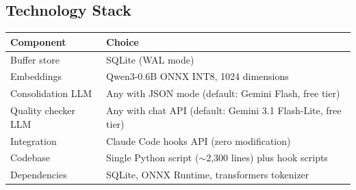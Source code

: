\documentclass[11pt,a4paper]{article}
\begin{document}

\subsection*{Technology Stack}

\begin{table}[h]
\centering
\small
\begin{tabular}{ll}
\toprule
\textbf{Component} & \textbf{Choice} \\
\midrule
Buffer store & SQLite (WAL mode) \\
Embeddings & Qwen3-0.6B ONNX INT8, 1024 dimensions \\
Consolidation LLM & Any with JSON mode (default: Gemini Flash, free tier) \\
Quality checker LLM & Any with chat API (default: Gemini 3.1 Flash-Lite, free tier) \\
Integration & Claude Code hooks API (zero modification) \\
Codebase & Single Python script ($\sim$2,300 lines) plus hook scripts \\
Dependencies & SQLite, ONNX Runtime, transformers tokenizer \\
\bottomrule
\end{tabular}
\end{table}


\end{document}
